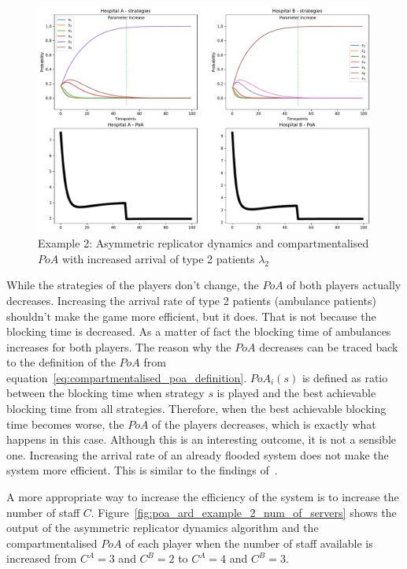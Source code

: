 \begin{figure}[H]
    \centering
    \includegraphics[width=\linewidth]{chapters/05_numerical_results/Bin/example_2/poa_ard_example_2_lambda_2.pdf}
    \caption{Example 2: Asymmetric replicator dynamics and compartmentalised
    \(PoA\) with increased arrival of type 2 patients \(\lambda_2\)}
    \label{fig:poa_ard_example_2_lambda_2}
\end{figure}

While the strategies of the players don't change, the \(PoA\) of both players
actually decreases.
Increasing the arrival rate of type 2 patients (ambulance patients) shouldn't
make the game more efficient, but it does.
That is not because the blocking time is decreased.
As a matter of fact the blocking time of ambulances increases for both players.
The reason why the \(PoA\) decreases can be traced back to the definition of the
\(PoA\) from equation~\ref{eq:compartmentalised_poa_definition}.
\(PoA_i(s)\) is defined as ratio between the blocking time when strategy \(s\)
is played and the best achievable blocking time from all strategies.
Therefore, when the best achievable blocking time becomes worse, the \(PoA\) of
the players decreases, which is exactly what happens in this case.
Although this is an interesting outcome, it is not a sensible one.
Increasing the arrival rate of an already flooded system does not make the
system more efficient.
This is similar to the findings of~\cite{knight_measuring_poa}.

A more appropriate way to increase the efficiency of the system is to increase
the number of staff \(C\).
Figure~\ref{fig:poa_ard_example_2_num_of_servers} shows the output of the
asymmetric replicator dynamics algorithm and the compartmentalised \(PoA\) of
each player when the number of staff available is increased from \(C^A = 3\)
and \(C^B = 2\) to \(C^A = 4\) and \(C^B = 3\).

